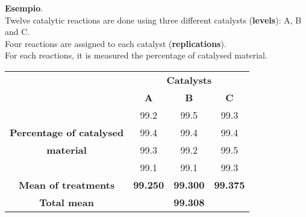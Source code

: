\begin{frame}
  \begin{small}
    \vspace*{.25cm} 
    \textbf{Esempio}.\\
    Twelve catalytic reactions are done using three different catalysts (\textbf{levels}): A, B and C.\\
    Four reactions are assigned to each catalyst (\textbf{replications}).\\
    For each reactions, it is measured the percentage of catalysed material.\\
    \vspace*{.75cm}
    \begin{tabular}{|c|c|c|c|}
      \cline{2-4}
      \multicolumn{1}{c}{} & \multicolumn{3}{|c|}{\textbf{Catalysts}}\\ \cline{2-4}
      \multicolumn{1}{c|}{} & \hspace*{.7cm}\textbf{A}\hspace*{.7cm} & \hspace*{.7cm}\textbf{B}\hspace*{.7cm} & \hspace*{.7cm}\textbf{C}\hspace*{.7cm} \\ \hline
      \multicolumn{1}{|c|}{\hspace*{4.5cm}} & 99.2 & 99.5 & 99.3 \\ \cline{2-4}
      \multicolumn{1}{|c|}{\textbf{Percentage of catalysed}} & 99.4 & 99.4 & 99.4 \\ \cline{2-4}
      \multicolumn{1}{|c|}{\textbf{material}} & 99.3 & 99.2 & 99.5 \\ \cline{2-4}
      \multicolumn{1}{|c|}{} & 99.1 & 99.1 & 99.3 \\ \hline
      \multicolumn{1}{|c|}{\textbf{Mean of treatments}} & \textbf{99.250} & \textbf{99.300} & \textbf{99.375} \\ \hline
      \multicolumn{1}{|c|}{\textbf{Total mean}} & \multicolumn{3}{|c|}{\textbf{99.308}} \\ \hline 
    \end{tabular}\\
    \vspace*{.5cm}
  \end{small}
\end{frame}

